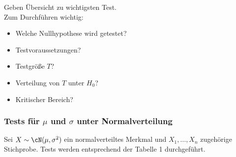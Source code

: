 Geben Übersicht zu wichtigsten Test.\\
Zum Durchführen wichtig:
\begin{itemize}
\item Welche Nullhypothese wird getestet?
\item Testvoraussetzungen?
\item Testgröße $T$?
\item Verteilung von $T$ unter $H_0$?
\item Kritischer Bereich?
\end{itemize}

\subsubsection[Tests für mü und sigma unter Normalverteilung]{Tests für $\mu$ und $\sigma$ unter Normalverteilung}

Sei $X\sim \cN(\mu, \sigma^2)$ ein normalverteiltes Merkmal und $X_1, \ldots, X_n$ zugehörige Stichprobe. Tests werden entsprechend der Tabelle 1 durchgeführt.





